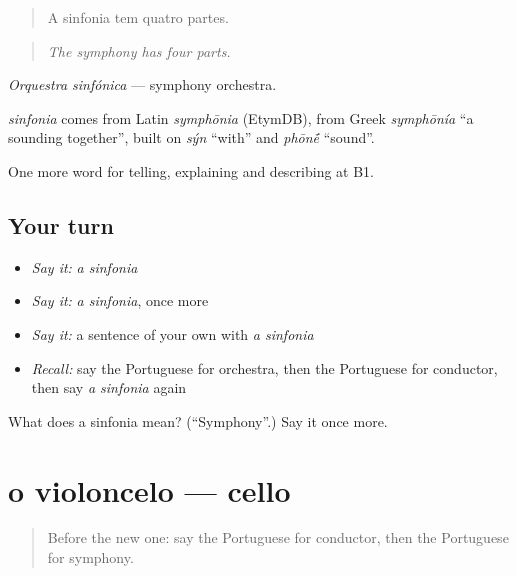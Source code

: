 \begin{quote}
A sinfonia tem quatro partes.
\end{quote}

\begin{quote}
\emph{The symphony has four parts.}
\end{quote}

\emph{Orquestra sinfónica} — symphony orchestra.

\begin{cousinweb}
\emph{sinfonia} comes from Latin \emph{symphōnia} (EtymDB), from Greek \emph{symphōnía} \textquotedblleft{}a sounding together\textquotedblright{}, built on \emph{sýn} \textquotedblleft{}with\textquotedblright{} and \emph{phōn\'{\={e}}} \textquotedblleft{}sound\textquotedblright{}.
\end{cousinweb}

\begin{grammarlens}[title={What you've built}]
One more word for telling, explaining and describing at B1.
\end{grammarlens}

\subsection*{Your turn}
\begin{itemize}
\raggedright
  \item \emph{Say it:} \emph{a sinfonia}
  \item \emph{Say it:} \emph{a sinfonia}, once more
  \item \emph{Say it:} a sentence of your own with \emph{a sinfonia}
  \item \emph{Recall:} say the Portuguese for orchestra, then the Portuguese for conductor, then say \emph{a sinfonia} again
\end{itemize}

\begin{tcolorbox}[breakable,colback=teal!4,colframe=teal!35!black,title={Before you move on}]
What does a sinfonia mean? (\textquotedblleft{}Symphony\textquotedblright{}.) Say it once more.
\end{tcolorbox}
\section[o violoncelo]{o violoncelo — cello}

\label{lesson:PT-C516-violoncelo}



\begin{quote}
Before the new one: say the Portuguese for conductor, then the Portuguese for symphony.
\end{quote}

